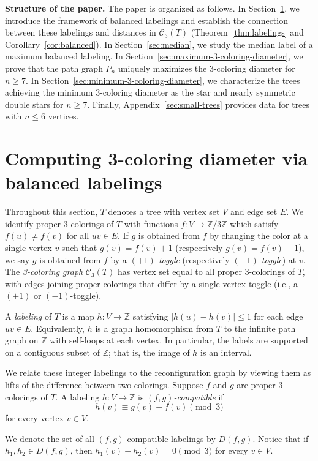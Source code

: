 \documentclass[12pt,reqno]{amsart}
\theoremstyle{definition}
\newcommand{\C}{\mathcal{C}}
\begin{document}
\textbf{Structure of the paper.} The paper is organized as follows. In Section~\ref{sec:balanced-labelings}, we introduce the framework of balanced labelings and establish the connection between these labelings and distances in $\C_3(T)$ (Theorem~\ref{thm:labelings} and Corollary~\ref{cor:balanced}). In Section~\ref{sec:median}, we study the median label of a maximum balanced labeling. In Section~\ref{sec:maximum-3-coloring-diameter}, we prove that the path graph $P_n$ uniquely maximizes the 3-coloring diameter for $n\geq 7$. In Section~\ref{sec:minimum-3-coloring-diameter}, we characterize the trees achieving the minimum 3-coloring diameter as the star and nearly symmetric double stars for $n\geq 7$. Finally, Appendix~\ref{sec:small-trees} provides data for trees with $n\le 6$ vertices.

\section{Computing 3-coloring diameter via balanced labelings}\label{sec:balanced-labelings}

Throughout this section, $T$ denotes a tree with vertex set $V$ and edge set $E$. We identify proper 3-colorings of $T$ with functions $f\colon V\to \mathbb{Z}/3\mathbb{Z}$ which satisfy
$f(u)\neq f(v)$ for all $uv\in E$. If $g$ is obtained from $f$ by changing the color at a single vertex $v$ such that $g(v)=f(v)+1$ (respectively $g(v)=f(v)-1$), we say $g$ is obtained from $f$ by a \emph{$(+1)$-toggle} (respectively \emph{$(-1)$-toggle}) at $v$. The \emph{3-coloring graph} $\C_3(T)$ has vertex set equal to all proper 3-colorings of $T$, with edges joining proper colorings that differ by a single vertex toggle (i.e., a $(+1)$ or $(-1)$-toggle).

A \emph{labeling} of $T$ is a map $h\colon V\to \mathbb{Z}$ satisfying $|h(u)-h(v)|\leq 1$ for each edge $uv\in E$. Equivalently, $h$ is a graph homomorphism from $T$ to the infinite path graph on $\mathbb{Z}$ with self-loops at each vertex. In particular, the labels are supported on a contiguous subset of $\mathbb Z$; that is, the image of $h$ is an interval. 

We relate these integer labelings to the reconfiguration graph by viewing them as lifts of the difference between two colorings. Suppose $f$ and $g$ are proper 3-colorings of $T$. A labeling $h\colon V\to \mathbb{Z}$ is \emph{$(f,g)$-compatible} if 
\[
h(v) \equiv g(v)-f(v)\pmod{3}
\]
for every vertex $v\in V$.

We denote the set of all $(f,g)$-compatible labelings by $D(f,g)$. Notice that if $h_1,h_2 \in D(f, g)$, then $h_1(v)-h_2(v)=0 \pmod{3}$ for every $v\in V$.
\end{document}
